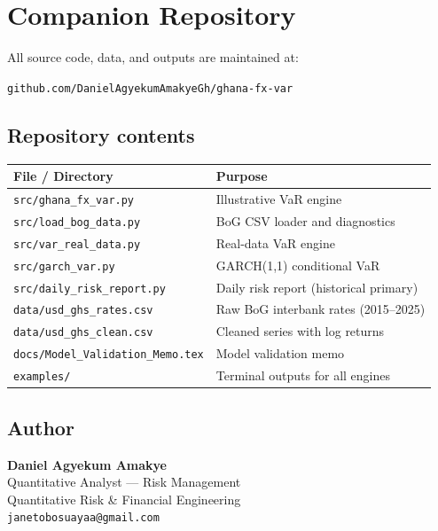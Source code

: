 \documentclass[11pt,a4paper]{article}
\makeatletter
\newcommand{\authorname}{Daniel Agyekum Amakye}
\newcommand{\authortitle}{Quantitative Analyst --- Risk Management}
\newcommand{\authordesk}{Quantitative Risk \& Financial Engineering}
\newcommand{\authoremail}{janetobosuayaa@gmail.com}
\newcommand{\reporef}{github.com/DanielAgyekumAmakyeGh/ghana-fx-var}
\makeatother
\begin{document}
\appendix
\section{Companion Repository}

All source code, data, and outputs are maintained at:

\begin{center}
\texttt{\reporef}
\end{center}

\subsection*{Repository contents}

\begin{table}[h!]
\centering
\renewcommand{\arraystretch}{1.3}
\begin{tabular}{L{6cm} L{8cm}}
\toprule
\textbf{File / Directory} & \textbf{Purpose} \\
\midrule
\texttt{src/ghana\_fx\_var.py}          & Illustrative VaR engine \\
\texttt{src/load\_bog\_data.py}         & BoG CSV loader and diagnostics \\
\texttt{src/var\_real\_data.py}         & Real-data VaR engine \\
\texttt{src/garch\_var.py}              & GARCH(1,1) conditional VaR \\
\texttt{src/daily\_risk\_report.py}     & Daily risk report (historical primary) \\
\texttt{data/usd\_ghs\_rates.csv}       & Raw BoG interbank rates (2015--2025) \\
\texttt{data/usd\_ghs\_clean.csv}       & Cleaned series with log returns \\
\texttt{docs/Model\_Validation\_Memo.tex} & Model validation memo \\
\texttt{examples/}                      & Terminal outputs for all engines \\
\bottomrule
\end{tabular}
\end{table}

\subsection*{Author}

\textbf{\authorname}\\
\authortitle\\
\authordesk\\
\texttt{\authoremail}
\end{document}
